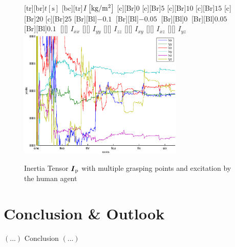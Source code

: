 \begin{figure}
	\centering	
	[tr][br]{$t\left[\mathrm{s}\right]$}
	[bc][tr]{$I\left[\mathrm{kg}/\mathrm{m}^2\right]$}
	[Br]{$0$}
	[Br]{$5$}
	[Br]{$10$}
	[Br]{$15$}
	[Br]{$20$}
	[Br]{$25$}
	[Br][Bl]{$-0.1\  $}
	[Br][Bl]{$-0.05\ $}
	[Br][Bl]{$0\  $}
	[Br][Bl]{$0.05\  $}
	[Br][Bl]{$0.1\  $}
	[][]{\tiny \hspace{0.2cm} $I_{xx}$}
	[][]{\tiny \hspace{0.2cm} $I_{yy}$}
	[][]{\tiny \hspace{0.2cm} $I_{zz}$}
	[][]{\tiny \hspace{0.2cm} $I_{xy}$}
	[][]{\tiny \hspace{0.2cm} $I_{xz}$}
	[][]{\tiny \hspace{0.2cm} $I_{yz}$}
	\includegraphics[width=0.7\textwidth]{figures/multiple_grasping_points_human_inertias.eps}
	\vspace{0.2cm}
	\caption[Inertia errors, multiple grasping points, excitation by human agent]{Inertia Tensor $\boldsymbol{I}_{\mathrm{p}}$ with multiple grasping points and excitation by the human agent}
	\label{fig:estim_inertia_multi_human}
\end{figure}

\chapter{Conclusion \& Outlook}

$\left(...\right)$ Conclusion $\left(...\right)$


